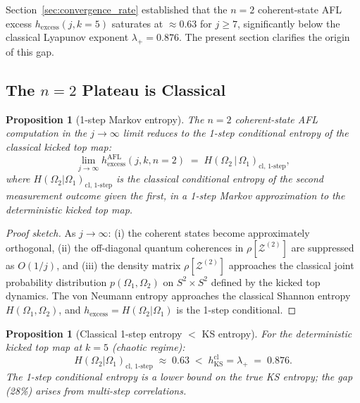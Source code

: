 \documentclass[12pt,a4paper]{article}
\newtheorem{proposition}[theorem]{Proposition}
\begin{document}
Section~\ref{sec:convergence_rate} established that the $n=2$
coherent-state AFL excess $h_{\mathrm{excess}}(j,k=5)$ saturates at
$\approx 0.63$ for $j \geq 7$, significantly below the classical Lyapunov
exponent $\lambda_+ = 0.876$.  The present section clarifies the origin
of this gap.

\subsection{The \texorpdfstring{$n=2$}{n=2} Plateau is Classical}
\label{subsec:classical_gap}

\begin{proposition}[1-step Markov entropy]
  \label{prop:one_step_markov}
  The $n=2$ coherent-state AFL computation in the $j \to \infty$ limit
  reduces to the \emph{1-step conditional entropy} of the classical kicked
  top map:
  \[
    \lim_{j \to \infty}
    h_{\mathrm{excess}}^{\mathrm{AFL}}(j, k, n=2)
    \;=\;
    H\!\left(\Omega_2 \,|\, \Omega_1\right)_{\text{cl, 1-step}},
  \]
  where $H(\Omega_2|\Omega_1)_{\text{cl, 1-step}}$ is the classical
  conditional entropy of the second measurement outcome given the first,
  in a 1-step Markov approximation to the deterministic kicked top map.
\end{proposition}

\begin{proof}[Proof sketch]
  As $j \to \infty$: (i) the coherent states become approximately
  orthogonal, (ii) the off-diagonal quantum coherences in
  $\rho[\mathcal{Z}^{(2)}]$ are suppressed as $O(1/j)$, and
  (iii) the density matrix $\rho[\mathcal{Z}^{(2)}]$ approaches the
  classical joint probability distribution $p(\Omega_1, \Omega_2)$
  on $S^2 \times S^2$ defined by the kicked top dynamics.  The von Neumann
  entropy approaches the classical Shannon entropy $H(\Omega_1, \Omega_2)$,
  and $h_{\mathrm{excess}} = H(\Omega_2|\Omega_1)$ is the 1-step conditional.
\end{proof}

\begin{proposition}[Classical 1-step entropy $<$ KS entropy]
  \label{prop:one_step_vs_ks}
  For the deterministic kicked top map at $k=5$ (chaotic regime):
  \[
    H(\Omega_2|\Omega_1)_{\text{cl, 1-step}} \;\approx\; 0.63
    \;<\; h_{\mathrm{KS}}^{\mathrm{cl}} = \lambda_+ \;=\; 0.876.
  \]
  The 1-step conditional entropy is a \emph{lower bound} on the true KS
  entropy; the gap (28\%) arises from multi-step correlations.
\end{proposition}
\end{document}
